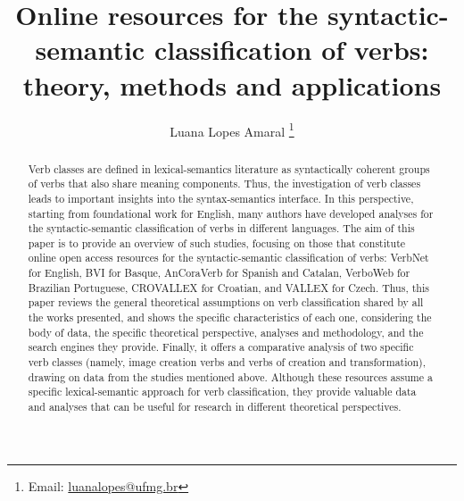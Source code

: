 \documentclass[english]{textolivre}
\title{Online resources for the syntactic-semantic classification of verbs: theory, methods and applications}
\author[1]{Luana Lopes Amaral \orcid{0000-0002-4290-1208} \thanks{Email: \href{mailto:luanalopes@ufmg.br}{luanalopes@ufmg.br}}}
\affil[1]{Faculdade de Letras, Universidade Federal de Minas Gerais, Belo Horizonte, Minas Gerais, Brasil.}
\begin{document}
\maketitle

\begin{polyabstract}
\begin{abstract}
Verb classes are defined in lexical-semantics literature as syntactically coherent groups of verbs that also share meaning components. Thus, the investigation of verb classes leads to important insights into the syntax-semantics interface. In this perspective, starting from  foundational work for English, many authors have developed analyses for the syntactic-semantic classification of verbs in different languages. The aim of this paper is to provide an overview of such studies, focusing on those that constitute online open access resources for the syntactic-semantic classification of verbs: VerbNet for English, BVI for Basque, AnCoraVerb for Spanish and Catalan, VerboWeb for Brazilian Portuguese, CROVALLEX for Croatian, and VALLEX for Czech. Thus, this paper reviews the general theoretical assumptions on verb classification shared by all the works presented, and shows the specific characteristics of each one, considering the body of data, the specific theoretical perspective, analyses and methodology, and the search engines they provide. Finally, it offers a comparative analysis of two specific verb classes (namely, image creation verbs and verbs of creation and transformation), drawing on data from the studies mentioned above. Although these resources assume a specific lexical-semantic approach for verb classification, they provide valuable data and analyses that can be useful for research in different theoretical perspectives.

\end{abstract}


\end{polyabstract}
\end{document}
